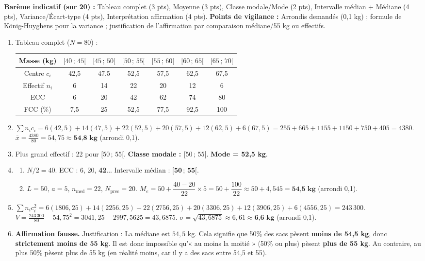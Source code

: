 \documentclass[11pt]{article}
\begin{document}
\begin{corrige}
\textbf{Barème indicatif (sur 20) :} Tableau complet (3 pts), Moyenne (3 pts), Classe modale/Mode (2 pts), Intervalle médian + Médiane (4 pts), Variance/Écart-type (4 pts), Interprétation affirmation (4 pts).
\textbf{Points de vigilance :} Arrondis demandés (0,1 kg) ; formule de König-Huyghens pour la variance ; justification de l'affirmation par comparaison médiane/55 kg ou effectifs.

\begin{enumerate}
\item Tableau complet ($N=80$) :
\begin{center}
\begin{tabular}{|c|cccccc|}\hline
Masse (kg) & $[40\,;\,45[$ & $[45\,;\,50[$ & $[50\,;\,55[$ & $[55\,;\,60[$ & $[60\,;\,65[$ & $[65\,;\,70[$ \\ \hline
Centre $c_i$ & 42,5 & 47,5 & 52,5 & 57,5 & 62,5 & 67,5 \\
Effectif $n_i$ & 6 & 14 & 22 & 20 & 12 & 6 \\
ECC & 6 & 20 & 42 & 62 & 74 & 80 \\
FCC (\%) & 7,5 & 25 & 52,5 & 77,5 & 92,5 & 100 \\ \hline
\end{tabular}
\end{center}
\item $\sum n_i c_i = 6(42,5)+14(47,5)+22(52,5)+20(57,5)+12(62,5)+6(67,5) = 255+665+1155+1150+750+405 = 4380$.
$\bar{x} = \frac{4380}{80} = 54,75 \approx \textbf{54,8 kg}$ (arrondi 0,1).
\item Plus grand effectif : 22 pour $[50\,;\,55[$. \textbf{Classe modale : $[50\,;\,55[$}. \textbf{Mode = 52,5 kg}.
\item \begin{enumerate}
\item $N/2 = 40$. ECC : 6, 20, \textbf{42}... Intervalle médian : $\boldsymbol{[50\,;\,55[}$.
\item $L=50$, $a=5$, $n_{\text{med}}=22$, $N_{\text{prec}}=20$.
$M_e = 50 + \dfrac{40-20}{22}\times 5 = 50 + \dfrac{100}{22} \approx 50 + 4,545 = \textbf{54,5 kg}$ (arrondi 0,1).
\end{enumerate}
\item $\sum n_i c_i^2 = 6(1806,25)+14(2256,25)+22(2756,25)+20(3306,25)+12(3906,25)+6(4556,25) = 243\,300$.
$V = \frac{243\,300}{80} - 54,75^2 = 3041,25 - 2997,5625 = 43,6875$.
$\sigma = \sqrt{43,6875} \approx 6,61 \approx \textbf{6,6 kg}$ (arrondi 0,1).
\item \textbf{Affirmation fausse.}
Justification : La médiane est $54,5$ kg. Cela signifie que 50\% des sacs pèsent \textbf{moins de 54,5 kg}, donc \textbf{strictement moins de 55 kg}. Il est donc impossible qu'« au moins la moitié » (50\% ou plus) pèsent \textbf{plus de 55 kg}. Au contraire, au plus 50\% pèsent plus de 55 kg (en réalité moins, car il y a des sacs entre 54,5 et 55).
\end{enumerate}
\end{corrige}
\end{document}
